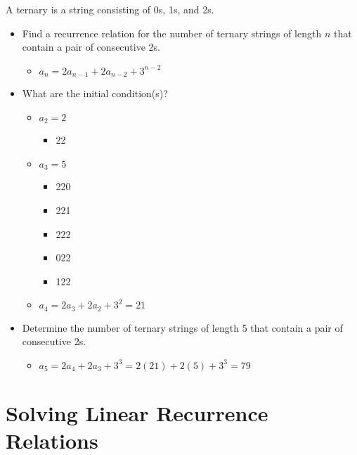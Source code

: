\begin{problem}
    A ternary is a string consisting of 0s, 1s, and 2s.

    \begin{itemize}
        \item Find a recurrence relation for the number of ternary strings of length $n$ that contain a pair of consecutive 2s.
        \begin{itemize}
            \item $a_n = 2a_{n-1} + 2a_{n-2} + 3^{n-2}$
        \end{itemize}

        \item What are the initial condition(s)?
        \begin{itemize}
            \item $a_2 = 2$
            \begin{itemize}
                \item 22
            \end{itemize}
            \item $a_3 = 5$
            \begin{itemize}
                \item 220
                \item 221
                \item 222
                \item 022
                \item 122
            \end{itemize}
            \item $a_4 = 2a_3 + 2a_2 + 3^2 = 21$ 
        \end{itemize}

        \item Determine the number of ternary strings of length 5 that contain a pair of consecutive 2s.
        \begin{itemize}
            \item $a_5 = 2a_4 + 2a_3 + 3^3 = 2(21)+2(5)+3^3 = 79$
        \end{itemize}
    \end{itemize}
\end{problem}



\section{Solving Linear Recurrence Relations}

